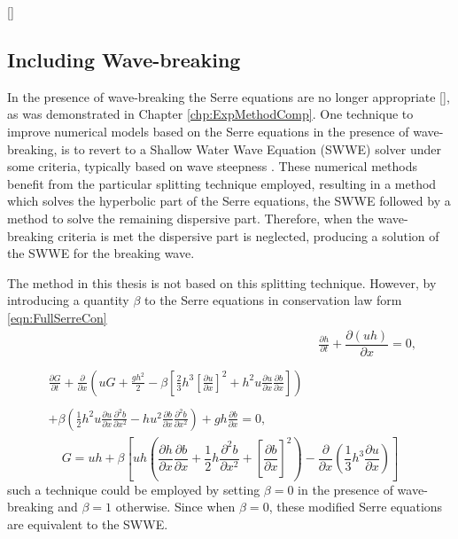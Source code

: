 []
\subsection{Including Wave-breaking}
In the presence of wave-breaking the Serre equations are no longer appropriate [], as was demonstrated in Chapter \ref{chp:ExpMethodComp}. One technique to improve numerical models based on the Serre equations in the presence of wave-breaking, is to revert to a Shallow Water Wave Equation (SWWE) solver under some criteria, typically based on wave steepness \cite{Tissier-2011,Filippini-etal-2016-381,DoCarmo-2019-125}. These numerical methods benefit from the particular splitting technique employed, resulting in a method which solves the hyperbolic part of the Serre equations, the SWWE followed by a method to solve the remaining dispersive part. Therefore, when the wave-breaking criteria is met the dispersive part is neglected, producing a solution of the SWWE for the breaking wave. 

The method in this thesis is not based on this splitting technique. However, by introducing a quantity $\beta$ to the Serre equations in conservation law form \eqref{eqn:FullSerreCon} 
	\begin{align*}
	& \frac{\partial h}{\partial t} + \dfrac{\partial (uh)}{\partial x} = 0 ,  \\ \nonumber \\
	\begin{split}
	\frac{\partial G}{\partial t}  + \frac{\partial}{\partial x} \left( {u} G + \frac{gh^2}{2} - \beta \left[ \frac{2}{3}h^3 \left[\frac{\partial {u}}{\partial x}\right]^2 + h^2 {u}\frac{\partial {u}}{\partial x}\frac{\partial b}{\partial x} \right] \right) \\ \\ +  \beta\left( \frac{1}{2}h^2 {u} \frac{\partial {u}}{\partial x} \frac{\partial^2 b}{\partial x^2}  - h {u}^2\frac{\partial b}{\partial x}\frac{\partial^2 b}{\partial x^2} \right) + gh\frac{\partial b}{\partial x}  = 0,
	\end{split}
	\end{align*}
	\begin{equation*}
	G = uh + \beta \left[{u}h \left(\frac{\partial h}{\partial x}\frac{\partial b}{\partial x} + \frac{1}{2}h\frac{\partial^2 b}{\partial x^2} + \left[\frac{\partial b}{\partial x}\right]^2 \right) - \frac{\partial}{\partial x}\left(\frac{1}{3}h^3  \frac{\partial {u}}{\partial x}\right)\right]
	\end{equation*}
such a technique could be employed by setting $\beta = 0$ in the presence of wave-breaking and $\beta = 1$ otherwise. Since when $\beta = 0$, these modified Serre equations are equivalent to the SWWE.

